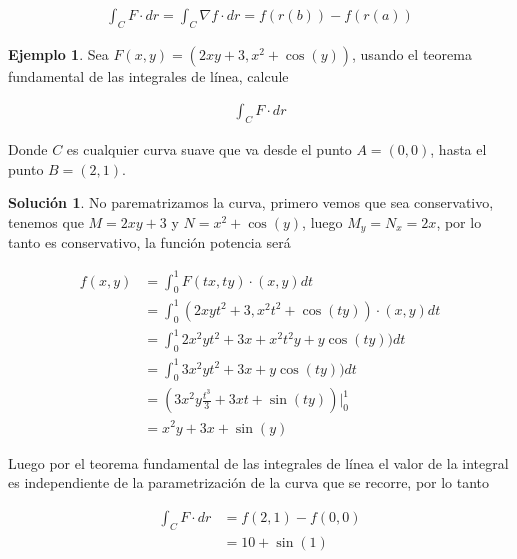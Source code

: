 \documentclass{article}
\theoremstyle{plain}
\theoremstyle{definition}
\newtheorem{ejem}[thm]{Ejemplo}
\newtheorem{sol}[thm]{Solución}
\begin{document}
\begin{align*}
    \int_C F \cdot dr =  \int_C \nabla f \cdot dr =f(r(b))-f(r(a))
\end{align*}

\begin{ejem}Sea $F(x,y)= (2xy+3,x^2+\cos(y))$, usando el teorema fundamental de las integrales de línea, calcule
\end{ejem}

\begin{align*}
    \int_C F \cdot dr
\end{align*}

Donde $C$ es cualquier curva suave que va desde el punto $A=(0,0)$, hasta el punto $B=(2,1)$. \\

\begin{sol}No parematrizamos la curva, primero vemos que sea conservativo, tenemos que $M= 2xy+3$ y $N=x^2+\cos(y)$, luego $M_y=N_x=2x$, por lo tanto es conservativo, la función potencia será
\end{sol}

\begin{align*}
    f(x,y) &= \int_0^1 F(tx,ty) \cdot (x,y) dt \\
    &= \int_0^1 (2xyt^2+3,x^2t^2+\cos(ty)) \cdot (x,y) dt \\
    &= \int_0^1 2x^2yt^2+3x +x^2t^2y+y\cos(ty)) dt \\
    &= \int_0^1 3x^2yt^2+3x +y\cos(ty)) dt \\
    &= \left( 3x^2y \frac{t^3}{3}+3xt +\sin(ty)\right)\Big|_0^1 \\
    &= x^2y+3x+\sin(y)
\end{align*}

Luego por el teorema fundamental de las integrales de línea el valor de la integral es independiente de la parametrización de la curva que se recorre, por lo tanto


\begin{align*}
    \int_C F \cdot dr &= f(2,1)- f(0,0) \\
    &= 10+\sin(1) \\
\end{align*}
\end{document}
